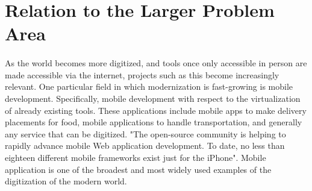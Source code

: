         
       
    
\section{Relation to the Larger Problem Area}
    \paragraph{}
     As the world becomes more digitized, and tools once only accessible in person are made accessible via the internet, projects such as this become increasingly relevant. One particular field in which modernization is fast-growing is mobile development. Specifically, mobile development with respect to the virtualization of already existing tools. These applications include mobile apps to make delivery placements for food, mobile applications to handle transportation, and generally any service that can be digitized. "The open-source community is helping to rapidly advance mobile Web application development. To date, no less than eighteen different mobile frameworks exist just for the iPhone"\cite{MobiOne}. Mobile application is one of the broadest and most widely used examples of the digitization of the modern world. 
     
